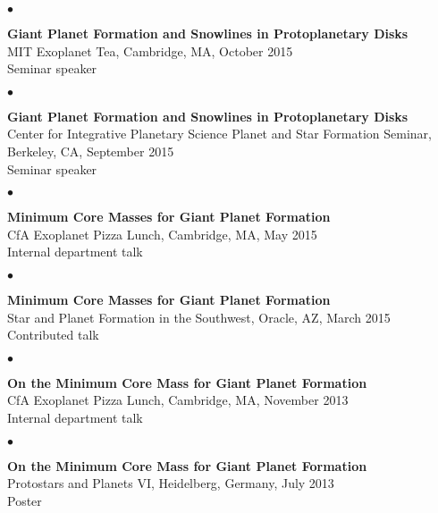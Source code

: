 \documentclass[margin,line]{res}
\newenvironment{list2}{
  \begin{list}{$\bullet$}{%
      \setlength{\itemsep}{0in}
      \setlength{\parsep}{0in} \setlength{\parskip}{0in}
      \setlength{\topsep}{0in} \setlength{\partopsep}{0in} 
      \setlength{\leftmargin}{0.2in}}}{\end{list}}
\begin{document}
\begin{resume}
\begin{list2}
\item[] {\bf Giant Planet Formation and Snowlines in Protoplanetary Disks} \\
MIT Exoplanet Tea, Cambridge, MA, October 2015 \\
Seminar speaker \\
\end{list2}

\begin{list2}
\item[] {\bf Giant Planet Formation and Snowlines in Protoplanetary Disks} \\
Center for Integrative Planetary Science Planet and Star Formation Seminar, Berkeley, CA, September 2015 \\
Seminar speaker \\
\end{list2}

\begin{list2}
\item[] {\bf Minimum Core Masses for Giant Planet Formation} \\
CfA Exoplanet Pizza Lunch, Cambridge, MA, May 2015  \\
Internal department talk \\
\end{list2}

\begin{list2}
\item[] {\bf Minimum Core Masses for Giant Planet Formation} \\
Star and Planet Formation in the Southwest, Oracle, AZ, March 2015  \\
Contributed talk \\
\end{list2}

\begin{list2}
\item[] {\bf On the Minimum Core Mass for Giant Planet Formation} \\
CfA Exoplanet Pizza Lunch, Cambridge, MA, November 2013  \\
Internal department talk \\
\end{list2}

\begin{list2}
\item[] {\bf On the Minimum Core Mass for Giant Planet Formation} \\
Protostars and Planets VI, Heidelberg, Germany, July 2013  \\
Poster \\
\end{list2}


\end{resume}
\end{document}
